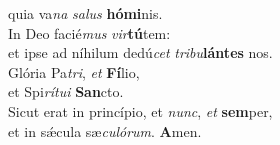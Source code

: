 \evenverse quia va\textit{na} \textit{sa}\textit{lus} \textbf{hó}\textbf{mi}nis.\\
\oddverse In Deo facié\textit{mus} \textit{vir}\textbf{tú}tem:~\*\\
\oddverse et ipse ad níhilum dedú\textit{cet} \textit{tri}\textit{bu}\textbf{lán}\textbf{tes} nos.\\
\evenverse Glória Pa\textit{tri}, \textit{et} \textbf{Fí}lio,~\*\\
\evenverse et Spi\textit{rí}\textit{tu}\textit{i} \textbf{San}cto.\\
\oddverse Sicut erat in princípio, et \textit{nunc}, \textit{et} \textbf{sem}per,~\*\\
\oddverse et in sǽcula sæ\textit{cu}\textit{ló}\textit{rum}. \textbf{A}men.\\

